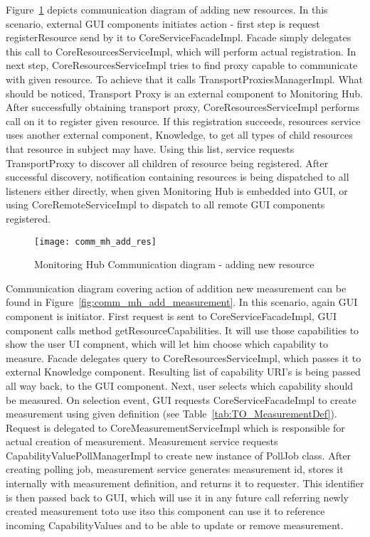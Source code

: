 Figure~\ref{fig:comm_mh_add_res} depicts communication diagram of adding new resources. In this scenario, external GUI
components initiates action - first step is request registerResource send by it to CoreServiceFacadeImpl. Facade simply
delegates this call to CoreResourcesServiceImpl, which will perform actual registration.
In next step, CoreResourcesServiceImpl tries to find proxy capable to communicate with given resource. To achieve that
it calls TransportProxiesManagerImpl. What should be noticed, Transport Proxy is an external component to
Monitoring Hub. After successfully obtaining transport proxy, CoreResourcesServiceImpl performs call on it to
register given resource. If this registration succeeds, resources service uses another external component, Knowledge, to
get all types of child resources that resource in subject may have. Using this list, service requests TransportProxy to
discover all children of resource being registered. After successful discovery, notification containing resources is
being dispatched to all listeners either directly, when given Monitoring Hub is embedded into GUI, or using
CoreRemoteServiceImpl to dispatch to all remote GUI components registered.

\begin{figure}[ht]
  \centering
  \texttt{[image: comm\_mh\_add\_res]}
  \caption{Monitoring Hub Communication diagram - adding new resource}
  \label{fig:comm_mh_add_res}
\end{figure}



Communication diagram covering action of addition new measurement can be found in
Figure~\ref{fig:comm_mh_add_measurement}. In this scenario, again GUI component is initiator. First request is
sent to CoreServiceFacadeImpl, GUI component calls method getResourceCapabilities. It will use those capabilities to
show the user UI compnent, which will let him choose which capability to measure. Facade delegates query to
CoreResourcesServiceImpl, which passes it to external Knowledge component. Resulting list of capability URI's is being
passed all way back, to the GUI component. Next, user selects which capability should be measured. On selection event,
GUI requests CoreServiceFacadeImpl to create measurement using given definition (see Table~\ref{tab:TO_MeasurementDef}).
Request is delegated to CoreMeasurementServiceImpl which is responsible for actual creation of measurement. Measurement
service requests CapabilityValuePollManagerImpl to create new instance of PollJob class. After creating polling job,
measurement service generates measurement id, stores it internally with measurement definition, and returns it to
requester. This identifier is then passed back to GUI, which will use it in any future call referring newly created
measurement toto use itso this component can use it to reference incoming CapabilityValues and to be able to update or
remove measurement.


